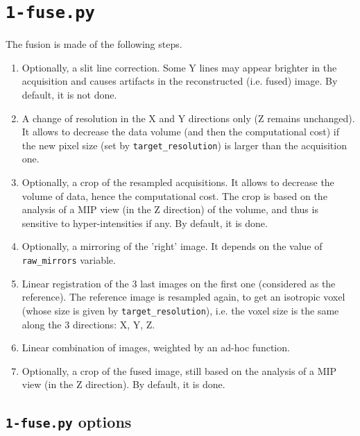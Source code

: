 \section{\texttt{1-fuse.py}}
\label{sec:cli:fuse}

The fusion is made of the following steps.
\begin{enumerate}
\itemsep -1ex
\item \label{it:fusion:slit:line} Optionally, a slit line correction. Some Y lines may appear brighter in the acquisition and causes artifacts in the reconstructed (i.e. fused) image. By default, it is not done.

\item A change of resolution in the X and Y directions only (Z remains unchanged). It allows to decrease the data volume (and then the computational cost) if the new pixel size (set by \verb|target_resolution|) is larger than the acquisition one.

\item \label{it:fusion:crop:1} Optionally, a crop of the resampled acquisitions. It allows to decrease the volume of data, hence the computational cost. The crop is based on the analysis of a MIP view (in the Z direction) of  the volume, and thus is sensitive to hyper-intensities if any. By default, it is done.

\item Optionally, a mirroring of the 'right' image. It depends on the value of  \verb|raw_mirrors| variable.

\item \label{it:fusion:registration} Linear registration of the 3 last images on the first one (considered as the reference). The reference image is resampled again, to get an isotropic voxel (whose size is given by \verb|target_resolution|), i.e. the voxel size is the same along the 3 directions: X, Y, Z.

\item Linear combination of images, weighted by an ad-hoc function.

\item  \label{it:fusion:crop:2} Optionally, a crop of the fused image, still based on the analysis of a MIP view (in the Z direction). By default, it is done.
\end{enumerate}




\subsection{\texttt{1-fuse.py} options}

